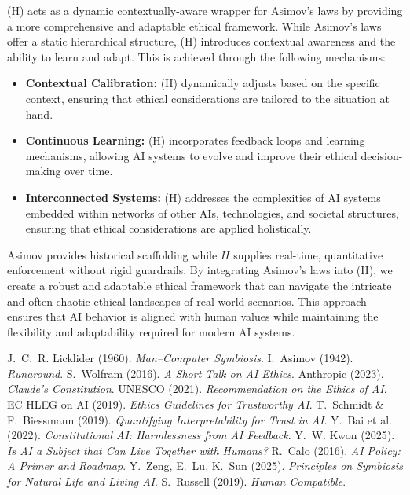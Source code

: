 \documentclass[a4paper,12pt]{article}
\begin{document}
 \hfill{}

(H) acts as a dynamic contextually-aware wrapper for Asimov’s laws by providing a more comprehensive and adaptable ethical framework. While Asimov’s laws offer a static hierarchical structure, (H) introduces contextual awareness and the ability to learn and adapt. This is achieved through the following mechanisms:

\begin{itemize}
    \item \textbf{Contextual Calibration:} (H) dynamically adjusts based on the specific context, ensuring that ethical considerations are tailored to the situation at hand.
    \item \textbf{Continuous Learning:} (H) incorporates feedback loops and learning mechanisms, allowing AI systems to evolve and improve their ethical decision-making over time.
    \item \textbf{Interconnected Systems:} (H) addresses the complexities of AI systems embedded within networks of other AIs, technologies, and societal structures, ensuring that ethical considerations are applied holistically.
\end{itemize}
Asimov provides historical scaffolding while \(H\) supplies real-time, quantitative enforcement without rigid guardrails. By integrating Asimov’s laws into (H), we create a robust and adaptable ethical framework that can navigate the intricate and often chaotic ethical landscapes of real-world scenarios. This approach ensures that AI behavior is aligned with human values while maintaining the flexibility and adaptability required for modern AI systems.

\newpage

\begin{thebibliography}{99}\setlength{\itemsep}{0pt}
 J.~C.~R. Licklider (1960). \textit{Man–Computer Symbiosis}.  
 I.~Asimov (1942). \textit{Runaround}.  
 S.~Wolfram (2016). \textit{A Short Talk on AI Ethics}.  
 Anthropic (2023). \textit{Claude’s Constitution}.  
 UNESCO (2021). \textit{Recommendation on the Ethics of AI}.  
 EC HLEG on AI (2019). \textit{Ethics Guidelines for Trustworthy AI}.  
 T.~Schmidt \& F.~Biessmann (2019). \textit{Quantifying Interpretability for Trust in AI}.  
 Y.~Bai et al. (2022). \textit{Constitutional AI: Harmlessness from AI Feedback}.  
 Y.~W. Kwon (2025). \textit{Is AI a Subject that Can Live Together with Humans?}  
 R.~Calo (2016). \textit{AI Policy: A Primer and Roadmap}.  
 Y.~Zeng, E.~Lu, K.~Sun (2025). \textit{Principles on Symbiosis for Natural Life and Living AI}.  
 S.~Russell (2019). \textit{Human Compatible}.  
\end{thebibliography}
\end{document}
